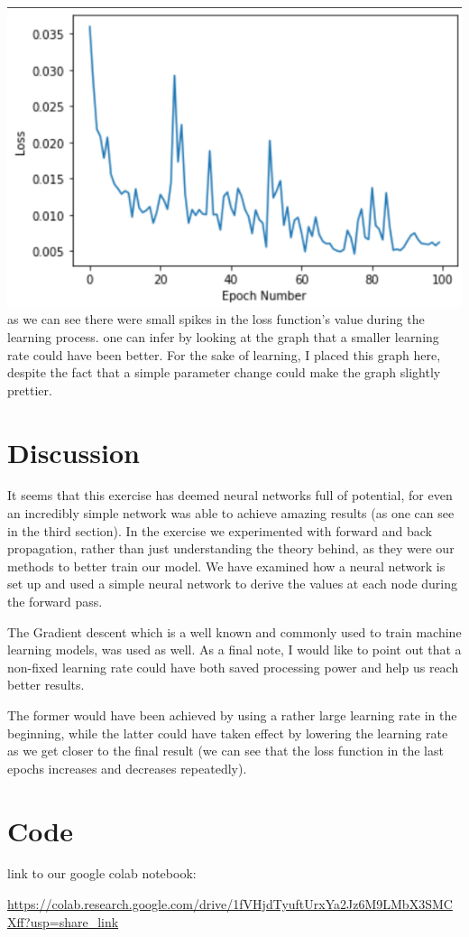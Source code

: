 \documentclass{article}
\begin{document}
\includegraphics{Loss Visualization.png}
as we can see there were small spikes in the loss function's value during the learning process.
\newline
one can infer by looking at the graph that a smaller learning rate could have been better. For the sake of learning, I placed this graph here, despite the fact that a simple parameter change could make the graph slightly prettier.

\section{Discussion}
It seems that this exercise has deemed neural networks full of potential, for even an incredibly simple network was able to achieve amazing results (as one can see in the third section).
\newline
In the exercise we experimented with forward and back propagation, rather than just understanding the theory behind, as they were our methods to better train our model.
\newline
We have examined how a neural network is set up and used a simple neural network to derive the values at each node during the forward pass.

The Gradient descent which is a well known and commonly used to train machine learning models, was used as well.
\newline
As a final note, I would like to point out that a non-fixed learning rate could have both saved processing power and help us reach better results.

The former would have been achieved by using a rather large learning rate in the beginning, while the latter could have taken effect by lowering the learning rate as we get closer to the final result (we can see that the loss function in the last epochs increases and decreases repeatedly).

\section{Code}

link to our google colab notebook: 

\url{https://colab.research.google.com/drive/1fVHjdTyuftUrxYa2Jz6M9LMbX3SMCXff?usp=share_link}



\end{document}
